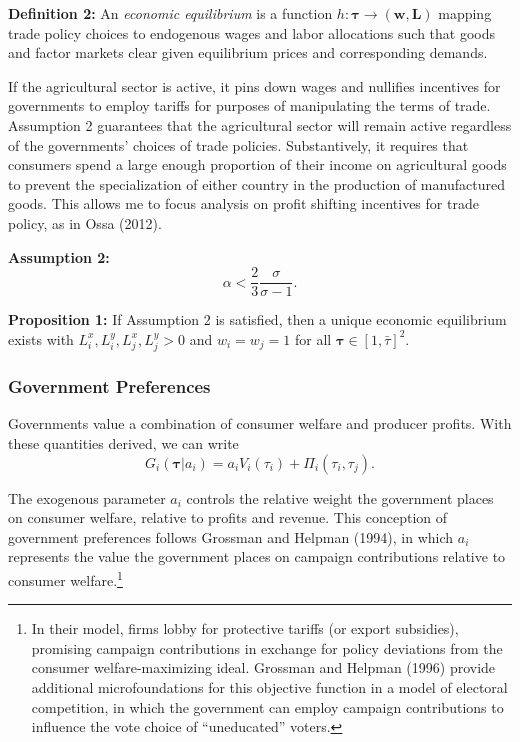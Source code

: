 \documentclass{puthesis}
\begin{document}
\textbf{Definition 2:} An \emph{economic equilibrium} is a function
\(h : \bm{\tau} \rightarrow \left( \bm{w}, \bm{L} \right)\) mapping
trade policy choices to endogenous wages and labor allocations such that
goods and factor markets clear given equilibrium prices and
corresponding demands.

If the agricultural sector is active, it pins down wages and nullifies
incentives for governments to employ tariffs for purposes of
manipulating the terms of trade. Assumption 2 guarantees that the
agricultural sector will remain active regardless of the governments'
choices of trade policies. Substantively, it requires that consumers
spend a large enough proportion of their income on agricultural goods to
prevent the specialization of either country in the production of
manufactured goods. This allows me to focus analysis on profit shifting
incentives for trade policy, as in Ossa (2012).

\textbf{Assumption 2:} \[
\alpha < \frac{2}{3} \frac{\sigma}{\sigma - 1} .
\]

\textbf{Proposition 1:} If Assumption 2 is satisfied, then a unique
economic equilibrium exists with \(L_i^x, L_i^y, L_j^x, L_j^y > 0\) and
\(w_i = w_j = 1\) for all \(\bm{\tau} \in [1, \bar{\tau}]^2\).

\subsubsection{Government Preferences}

Governments value a combination of consumer welfare and producer
profits. With these quantities derived, we can write
\begin{equation} \label{eq:G}
G_i(\bm{\tau} | a_i) = a_i V_i(\tau_i) + \Pi_i(\tau_i, \tau_j) .
\end{equation}

The exogenous parameter \(a_i\) controls the relative weight the
government places on consumer welfare, relative to profits and revenue.
This conception of government preferences follows Grossman and Helpman
(1994), in which \(a_i\) represents the value the government places on
campaign contributions relative to consumer welfare.\footnote{In their
  model, firms lobby for protective tariffs (or export subsidies),
  promising campaign contributions in exchange for policy deviations
  from the consumer welfare-maximizing ideal. Grossman and Helpman
  (1996) provide additional microfoundations for this objective function
  in a model of electoral competition, in which the government can
  employ campaign contributions to influence the vote choice of
  ``uneducated'' voters.}
\end{document}
